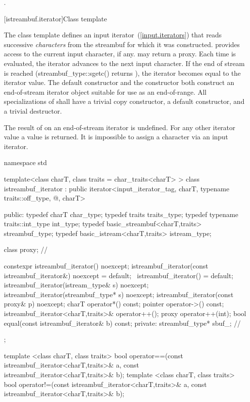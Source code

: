\begin{itemdescr}
\pnum
\returns
{}.
\end{itemdescr}

[istreambuf.iterator]{Class template }

\pnum
The
class template
defines an input iterator~(\ref{input.iterators}) that
reads successive
\textit{characters}
from the streambuf for which it was constructed.
provides access to the current input character, if any.
\enternote {} may return a proxy. \exitnote
Each time
is evaluated, the iterator advances to the next input character.
If the end of stream is reached (streambuf_type::sgetc() returns
),
the iterator becomes equal to the
iterator value.
The default constructor
and the constructor
both construct an end-of-stream iterator object suitable for use
as an end-of-range.
All specializations of  shall have a trivial copy
constructor, a  default constructor, and a trivial destructor.

\pnum
The result of
on an end-of-stream iterator is undefined.
%
For any other iterator value a
value is returned.
It is impossible to assign a character via an input iterator.

%
\begin{codeblock}
namespace std {
  template<class charT, class traits = char_traits<charT> >
  class istreambuf_iterator
     : public iterator<input_iterator_tag, charT,
                       typename traits::off_type, @\unspec@, charT> {
  public:
    typedef charT                         char_type;
    typedef traits                        traits_type;
    typedef typename traits::int_type     int_type;
    typedef basic_streambuf<charT,traits> streambuf_type;
    typedef basic_istream<charT,traits>   istream_type;

    class proxy;                          // \expos

    constexpr istreambuf_iterator() noexcept;
    istreambuf_iterator(const istreambuf_iterator&) noexcept = default;
    ~istreambuf_iterator() = default;
    istreambuf_iterator(istream_type& s) noexcept;
    istreambuf_iterator(streambuf_type* s) noexcept;
    istreambuf_iterator(const proxy& p) noexcept;
    charT operator*() const;
    pointer operator->() const;
    istreambuf_iterator<charT,traits>& operator++();
    proxy operator++(int);
    bool equal(const istreambuf_iterator& b) const;
  private:
    streambuf_type* sbuf_;                // \expos
  };

  template <class charT, class traits>
    bool operator==(const istreambuf_iterator<charT,traits>& a,
            const istreambuf_iterator<charT,traits>& b);
  template <class charT, class traits>
    bool operator!=(const istreambuf_iterator<charT,traits>& a,
            const istreambuf_iterator<charT,traits>& b);
}
\end{codeblock}

